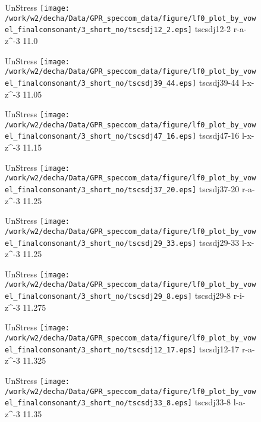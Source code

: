 \documentclass{article}
\begin{document}
\begin{figure}[t]
\begin{minipage}[b]{.24\textwidth}
UnStress
\centering
\texttt{[image: /work/w2/decha/Data/GPR\_speccom\_data/figure/lf0\_plot\_by\_vowel\_finalconsonant/3\_short\_no/tscsdj12\_2.eps]}
tscsdj12-2 r-a-z\textasciicircum-3 11.0
\end{minipage}
\begin{minipage}[b]{.24\textwidth}
UnStress
\centering
\texttt{[image: /work/w2/decha/Data/GPR\_speccom\_data/figure/lf0\_plot\_by\_vowel\_finalconsonant/3\_short\_no/tscsdj39\_44.eps]}
tscsdj39-44 l-x-z\textasciicircum-3 11.05
\end{minipage}
\begin{minipage}[b]{.24\textwidth}
UnStress
\centering
\texttt{[image: /work/w2/decha/Data/GPR\_speccom\_data/figure/lf0\_plot\_by\_vowel\_finalconsonant/3\_short\_no/tscsdj47\_16.eps]}
tscsdj47-16 l-x-z\textasciicircum-3 11.15
\end{minipage}
\begin{minipage}[b]{.24\textwidth}
UnStress
\centering
\texttt{[image: /work/w2/decha/Data/GPR\_speccom\_data/figure/lf0\_plot\_by\_vowel\_finalconsonant/3\_short\_no/tscsdj37\_20.eps]}
tscsdj37-20 r-a-z\textasciicircum-3 11.25
\end{minipage}
\end{figure}
\clearpage
\begin{figure}[t]
\begin{minipage}[b]{.24\textwidth}
UnStress
\centering
\texttt{[image: /work/w2/decha/Data/GPR\_speccom\_data/figure/lf0\_plot\_by\_vowel\_finalconsonant/3\_short\_no/tscsdj29\_33.eps]}
tscsdj29-33 l-x-z\textasciicircum-3 11.25
\end{minipage}
\begin{minipage}[b]{.24\textwidth}
UnStress
\centering
\texttt{[image: /work/w2/decha/Data/GPR\_speccom\_data/figure/lf0\_plot\_by\_vowel\_finalconsonant/3\_short\_no/tscsdj29\_8.eps]}
tscsdj29-8 r-i-z\textasciicircum-3 11.275
\end{minipage}
\begin{minipage}[b]{.24\textwidth}
UnStress
\centering
\texttt{[image: /work/w2/decha/Data/GPR\_speccom\_data/figure/lf0\_plot\_by\_vowel\_finalconsonant/3\_short\_no/tscsdj12\_17.eps]}
tscsdj12-17 r-a-z\textasciicircum-3 11.325
\end{minipage}
\begin{minipage}[b]{.24\textwidth}
UnStress
\centering
\texttt{[image: /work/w2/decha/Data/GPR\_speccom\_data/figure/lf0\_plot\_by\_vowel\_finalconsonant/3\_short\_no/tscsdj33\_8.eps]}
tscsdj33-8 l-a-z\textasciicircum-3 11.35
\end{minipage}
\end{figure}
\end{document}
